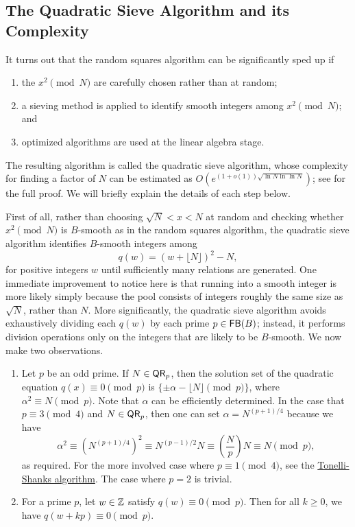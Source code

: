 \subsection{The Quadratic Sieve Algorithm and its Complexity}
It turns out that the random squares algorithm can be significantly sped up if 

\begin{enumerate}[(1)]
    \item the $x^2 \pmod N$ are carefully chosen rather than at random; 
    \item a sieving method is applied to identify smooth integers among 
    $x^2 \pmod N$; and 
    \item optimized algorithms are used at the linear algebra stage. 
\end{enumerate}

The resulting algorithm is called the quadratic sieve algorithm, whose 
complexity for finding a factor of $N$ can be estimated as 
$O(e^{(1+o(1))\sqrt{\ln N \ln\ln N}})$; see \cite{Pomerance96atale} for the 
full proof. We will briefly explain the details of each step below. 

First of all, rather than choosing $\sqrt N < x < N$ at random and checking 
whether $x^2 \pmod N$ is $B$-smooth as in the random squares algorithm, the 
quadratic sieve algorithm identifies $B$-smooth integers among 
\[ q(w) = (w + \lfloor N \rfloor)^2 - N, \] 
for positive integers $w$ until sufficiently many relations are generated. 
One immediate improvement to notice here is that running into a smooth integer 
is more likely simply because the pool consists of integers roughly the same 
size as $\sqrt N$, rather than $N$. More significantly, the quadratic sieve 
algorithm avoids exhaustively dividing each $q(w)$ by each prime $p \in {\sf FB}(B)$; 
instead, it performs division operations only on the integers that are likely 
to be $B$-smooth. We now make two observations. 

\begin{enumerate}[(1)]
    \item Let $p$ be an odd prime. If $N \in {\sf QR}_p$, then the solution set 
    of the quadratic equation $q(x) \equiv 0 \pmod p$ is 
    $\{\pm\alpha - \lfloor N \rfloor \pmod p\}$, where $\alpha^2 \equiv N \pmod p$. 
    Note that $\alpha$ can be efficiently determined. In the case that 
    $p \equiv 3 \pmod 4$ and $N \in {\sf QR}_p$, then one can set $\alpha = 
    N^{(p+1)/4}$ because we have 
    \[ \alpha^2 \equiv \left( N^{(p+1)/4} \right)^{\!2} \equiv N^{(p-1)/2} N 
    \equiv \left( \frac{N}{p} \right) N \equiv N \pmod p, \] 
    as required. For the more involved case where $p \equiv 1 \pmod 4$, see the 
    \href{https://en.wikipedia.org/wiki/Tonelli%E2%80%93Shanks_algorithm}
    {Tonelli-Shanks algorithm}. The case where $p = 2$ is trivial. 
    \item For a prime $p$, let $w \in \mathbb{Z}$ satisfy $q(w) \equiv 0 \pmod p$. 
    Then for all $k \geq 0$, we have $q(w + kp) \equiv 0 \pmod p$. 
\end{enumerate}


